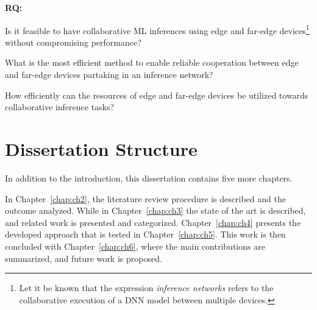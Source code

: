 \begin{list}{\textbf{RQ:}}{}
  \item Is it feasible to have collaborative ML inferences using edge 
  and far-edge devices\footnote{Let it be known that the expression 
  \textit{inference networks} refers to the collaborative execution of 
  a \ac{DNN} model between multiple devices.} without compromising 
  performance?

  \item What is the most efficient method to enable reliable cooperation
  between edge and far-edge devices partaking in an inference network?

  \item How efficiently can the resources of edge and far-edge devices 
  be utilized towards collaborative inference tasks?

\end{list}

\section{Dissertation Structure} \label{sec:structure}

In addition to the introduction, this dissertation contains five more 
chapters.

In Chapter~\ref{chap:ch2}, the literature review procedure is described and the
outcome analyzed. While in Chapter~\ref{chap:ch3} the state of the art is described, 
and related work is presented and categorized.
Chapter~\ref{chap:ch4} presents the developed approach that is tested in 
Chapter~\ref{chap:ch5}. This work is then concluded with Chapter~\ref{chap:ch6}, 
where the main contributions are summarized, and future work is proposed.

